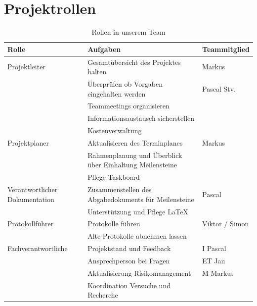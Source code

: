\documentclass[a4paper]{report}
\begin{document}
\section{Projektrollen}
\label{sec:ProjektRollen}
\begin{table}[h!]
	\begin{tabular}{|p{}|p{}|p{}|}
		\hline
		\textbf{Rolle} & \textbf{Aufgaben} & \textbf{Teammitglied} \\
		\hline
		Projektleiter & Gesamtübersicht des Projektes halten  & Markus \\
		& Überprüfen ob Vorgaben eingehalten werden & Pascal Stv. \\
		& Teammeetings organisieren & \\
		& Informationsaustausch sicherstellen & \\
		& Kostenverwaltung & \\
		\hline
		Projektplaner & Aktualisieren des Terminplanes & Markus\\
		& Rahmenplanung und Überblick über Einhaltung Meilensteine& \\
		& Pflege Taskboard & \\
		\hline
		Verantwortlicher Dokumentation& Zusammenstellen des Abgabedokuments für Meilensteine & Pascal \\
		& Unterstützung und Pflege LaTeX &  \\
		\hline
		Protokollführer & Protokolle führen & Viktor / Simon \\
		& Alte Protokolle abnehmen lassen & \\
		\hline
		Fachverantwortliche & Projektstand und Feedback & I Pascal \\
		& Ansprechperson bei Fragen & ET Jan\\
		& Aktualisierung Risikomanagement & M Markus\\
		& Koordination Versuche und Recherche & \\
		\hline
	\end{tabular}
	\caption{Rollen in unserem Team}
	\label{tab:Projektrollen}
\end{table}
\end{document}
